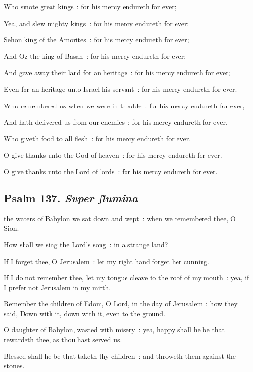 Who smote great kings~: for his mercy endureth for ever;\par
{}Yea, and slew mighty kings~: for his mercy endureth for ever;\par
{}Sehon king of the Amorites~: for his mercy endureth for ever;\par
{}And Og the king of Basan~: for his mercy endureth for ever;\par
{}And gave away their land for an heritage~: for his mercy endureth for ever;\par
{}Even for an heritage unto Israel his servant~: for his mercy endureth for ever.\par
{}Who remembered us when we were in trouble~: for his mercy endureth for ever;\par
{}And hath delivered us from our enemies~: for his mercy endureth for ever.\par
{}Who giveth food to all flesh~: for his mercy endureth for ever.\par
{}O give thanks unto the God of heaven~: for his mercy endureth for ever.\par
{}O give thanks unto the Lord of lords~: for his mercy endureth for ever.\par


\subsection{Psalm 137. \textit{Super flumina}}


 the waters of Babylon we sat down and wept~: when we remembered thee, O Sion.\par
{}
How shall we sing the Lord's song~: in a strange land?\par
{}If I forget thee, O Jerusalem~: let my right hand forget her cunning.\par
{}If I do not remember thee, let my tongue cleave to the roof of my mouth~: yea, if I prefer not Jerusalem in my mirth.\par
{}Remember the children of Edom, O Lord, in the day of Jerusalem~: how they said, Down with it, down with it, even to the ground.\par
{}O daughter of Babylon, wasted with misery~: yea, happy shall he be that rewardeth thee, as thou hast served us.\par
{}Blessed shall he be that taketh thy children~: and throweth them against the stones.\par


